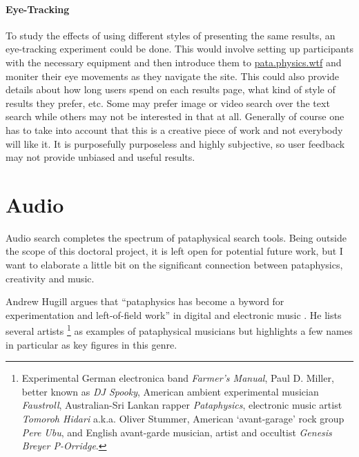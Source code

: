 \paragraph{Eye-Tracking}
To study the effects of using different styles of presenting the same results, an eye-tracking experiment could be done. This would involve setting up participants with the necessary equipment and then introduce them to \url{pata.physics.wtf} and moniter their eye movements as they navigate the site. This could also provide details about how long users spend on each results page, what kind of style of results they prefer, etc. Some may prefer image or video search over the text search while others may not be interested in that at all. Generally of course one has to take into account that this is a creative piece of work and not everybody will like it. It is purposefully purposeless and highly subjective, so user feedback may not provide unbiased and useful results.


\section{Audio}
\label{s:audio}

Audio search completes the spectrum of pataphysical search tools. Being outside the scope of this doctoral project, it is left open for potential future work, but I want to elaborate a little bit on the significant connection between pataphysics, creativity and music.

Andrew Hugill argues that ``pataphysics has become a byword for experimentation and left-of-field work'' in digital and electronic music \autocite*{Hugill2012}. He lists several artists \footnote{Experimental German electronica band \textit{Farmer’s Manual}, Paul D. Miller, better known as \textit{DJ Spooky}, American ambient experimental musician \textit{Faustroll}, Australian-Sri Lankan rapper \textit{Pataphysics}, electronic music artist \textit{Tomoroh Hidari} a.k.a. Oliver Stummer, American `avant-garage' rock group \textit{Pere Ubu}, and English avant-garde musician, artist and occultist \textit{Genesis Breyer P-Orridge}.} as examples of pataphysical musicians but highlights a few names in particular as key figures in this genre. 


